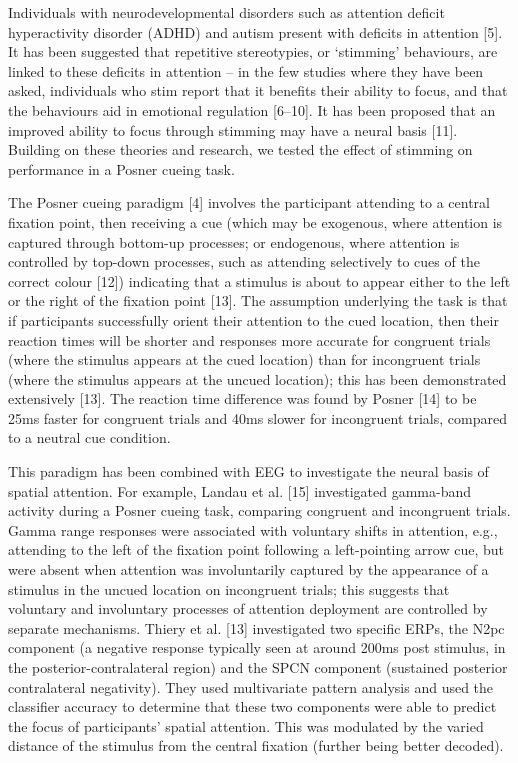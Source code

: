 \documentclass[
  letterpaper,
  DIV=11,
  numbers=noendperiod]{scrartcl}
\begin{document}
Individuals with neurodevelopmental disorders such as attention deficit
hyperactivity disorder (ADHD) and autism present with deficits in
attention {[}5{]}. It has been suggested that repetitive stereotypies,
or `stimming' behaviours, are linked to these deficits in attention --
in the few studies where they have been asked, individuals who stim
report that it benefits their ability to focus, and that the behaviours
aid in emotional regulation {[}6--10{]}. It has been proposed that an
improved ability to focus through stimming may have a neural basis
{[}11{]}. Building on these theories and research, we tested the effect
of stimming on performance in a Posner cueing task.

The Posner cueing paradigm {[}4{]} involves the participant attending to
a central fixation point, then receiving a cue (which may be exogenous,
where attention is captured through bottom-up processes; or endogenous,
where attention is controlled by top-down processes, such as attending
selectively to cues of the correct colour {[}12{]}) indicating that a
stimulus is about to appear either to the left or the right of the
fixation point {[}13{]}. The assumption underlying the task is that if
participants successfully orient their attention to the cued location,
then their reaction times will be shorter and responses more accurate
for congruent trials (where the stimulus appears at the cued location)
than for incongruent trials (where the stimulus appears at the uncued
location); this has been demonstrated extensively {[}13{]}. The reaction
time difference was found by Posner {[}14{]} to be 25ms faster for
congruent trials and 40ms slower for incongruent trials, compared to a
neutral cue condition.

This paradigm has been combined with EEG to investigate the neural basis
of spatial attention. For example, Landau et al. {[}15{]} investigated
gamma-band activity during a Posner cueing task, comparing congruent and
incongruent trials. Gamma range responses were associated with voluntary
shifts in attention, e.g., attending to the left of the fixation point
following a left-pointing arrow cue, but were absent when attention was
involuntarily captured by the appearance of a stimulus in the uncued
location on incongruent trials; this suggests that voluntary and
involuntary processes of attention deployment are controlled by separate
mechanisms. Thiery et al. {[}13{]} investigated two specific ERPs, the
N2pc component (a negative response typically seen at around 200ms post
stimulus, in the posterior-contralateral region) and the SPCN component
(sustained posterior contralateral negativity). They used multivariate
pattern analysis and used the classifier accuracy to determine that
these two components were able to predict the focus of participants'
spatial attention. This was modulated by the varied distance of the
stimulus from the central fixation (further being better decoded).
\end{document}
